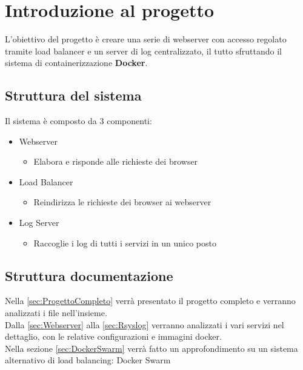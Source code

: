 \documentclass[../DocumentazioneProgetto.tex]{subfiles}
\begin{document}
	\section{Introduzione al progetto}
	L'obiettivo del progetto è creare una serie di webserver con accesso regolato tramite load balancer e un server di log centralizzato, il tutto sfruttando il sistema di containerizzazione \textbf{Docker}.
	\subsection{Struttura del sistema} 
	Il sistema è composto da 3 componenti:
	\begin{itemize}
		\item Webserver
		\begin{itemize}
			\item Elabora e risponde alle richieste dei browser
		\end{itemize}
		\item Load Balancer
		\begin{itemize}
			\item Reindirizza le richieste dei browser ai webserver
		\end{itemize}
		\item Log Server
		\begin{itemize}
			\item Raccoglie i log di tutti i servizi in un unico posto
		\end{itemize}
	\end{itemize}
	\subsection{Struttura documentazione}
	Nella \autoref{sec:ProgettoCompleto} verrà presentato il progetto completo e verranno analizzati i file nell'insieme.\\
	Dalla  \autoref{sec:Webserver} alla \autoref{sec:Rsyslog} verranno analizzati i vari servizi nel dettaglio, con le relative configurazioni e immagini docker.\\
	Nella sezione \autoref{sec:DockerSwarm} verrà fatto un approfondimento su un sistema alternativo di load balancing: Docker Swarm
\end{document}
